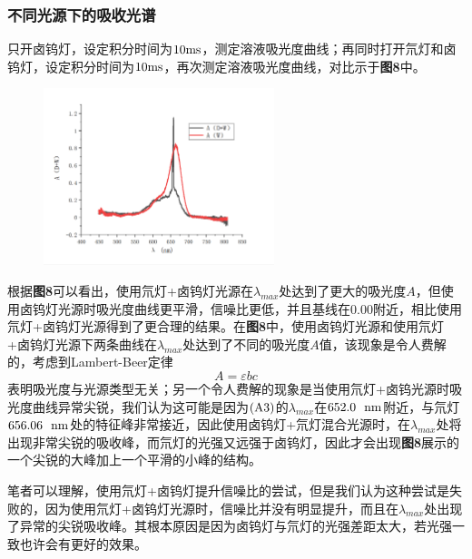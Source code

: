 \documentclass[12pt]{article}
\begin{document}
	 		\subsubsection{不同光源下的吸收光谱}
			只开卤钨灯，设定积分时间为$10 {\rm ms}$，测定溶液吸光度曲线；再同时打开氘灯和卤钨灯，设定积分时间为$10 {\rm ms}$，再次测定溶液吸光度曲线，对比示于\textbf{图8}中。\par
			\begin{figure}[h]
				\centering
				\includegraphics[width=0.6\textwidth]{8.png}
			\end{figure}
			根据\textbf{图8}可以看出，使用氘灯+卤钨灯光源在$\lambda_{max}$处达到了更大的吸光度$A$，但使用卤钨灯光源时吸光度曲线更平滑，信噪比更低，并且基线在0.00附近，相比使用氘灯+卤钨灯光源得到了更合理的结果。在\textbf{图8}中，使用卤钨灯光源和使用氘灯+卤钨灯光源下两条曲线在$\lambda_{max}$处达到了不同的吸光度$A$值，该现象是令人费解的，考虑到Lambert-Beer定律
			$$ A=\varepsilon bc $$
			表明吸光度与光源类型无关；另一个令人费解的现象是当使用氘灯+卤钨光源时吸光度曲线异常尖锐，我们认为这可能是因为${\rm (A3)}$的$\lambda_{max}$在$652.0\ \ {\rm nm}$附近，与氘灯$656.06\ \ {\rm nm}$处的特征峰非常接近，因此使用卤钨灯+氘灯混合光源时，在$\lambda_{max}$处将出现非常尖锐的吸收峰，而氘灯的光强又远强于卤钨灯，因此才会出现\textbf{图8}展示的一个尖锐的大峰加上一个平滑的小峰的结构。\par 
		 	笔者可以理解，使用氘灯+卤钨灯提升信噪比的尝试，但是我们认为这种尝试是失败的，因为使用氘灯+卤钨灯光源时，信噪比并没有明显提升，而且在$\lambda_{max}$处出现了异常的尖锐吸收峰。其根本原因是因为卤钨灯与氘灯的光强差距太大，若光强一致也许会有更好的效果。\par
			
\end{document}

